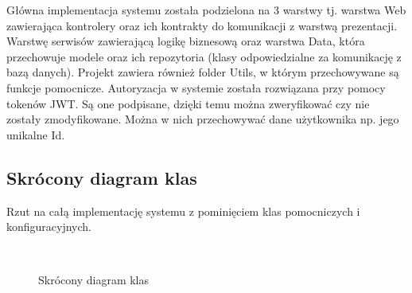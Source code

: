\documentclass[a4paper,11pt]{report}
\begin{document}
Główna implementacja systemu została podzielona na 3 warstwy tj. warstwa Web zawierająca kontrolery oraz ich kontrakty do komunikacji z warstwą prezentacji.
Warstwę serwisów zawierającą logikę biznesową oraz warstwa Data, która przechowuje modele oraz ich repozytoria (klasy odpowiedzialne za komunikację z bazą danych).
Projekt zawiera również folder Utils, w którym przechowywane są funkcje pomocnicze. Autoryzacja w systemie została rozwiązana przy pomocy tokenów JWT.
Są one podpisane, dzięki temu można zweryfikować czy nie zostały zmodyfikowane. Można w nich przechowywać dane użytkownika np. jego unikalne Id.
\subsection{Skrócony diagram klas}
Rzut na całą implementację systemu z pominięciem klas pomocniczych i konfiguracyjnych.
\begin{figure}[H]
	\centering
	\\
	\caption{Skrócony diagram klas}
	\label{fig:gamitude_backend}
\end{figure}
\end{document}
